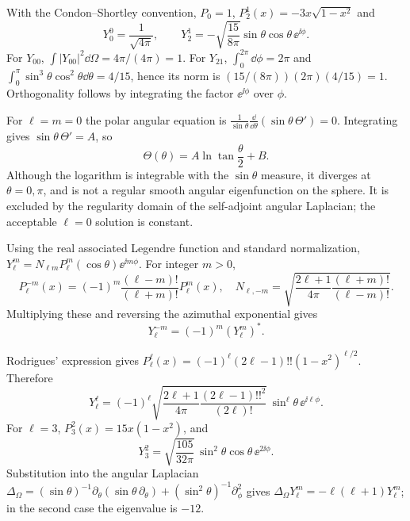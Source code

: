 With the Condon--Shortley convention,
$P_0=1$, $P_2^1(x)=-3x\sqrt{1-x^2}$ and
\begin{equation}
\boxed{Y_0^0=\frac1{\sqrt{4\pi}},
\qquad Y_2^1=-\sqrt{\frac{15}{8\pi}}\sin\theta
\cos\theta\,\ee^{\ii\phi}}.
\end{equation}
For $Y_{00}$,
$\int|Y_{00}|^2\dd\Omega=4\pi/(4\pi)=1$.
For $Y_{21}$,
$\int_0^{2\pi}\dd\phi=2\pi$ and
$\int_0^\pi\sin^3\theta\cos^2\theta\dd\theta
=4/15$, hence its norm is
$(15/(8\pi))(2\pi)(4/15)=1$.
Orthogonality follows by integrating the
factor $\ee^{\ii\phi}$ over $\phi$.

For $\ell=m=0$ the polar angular equation is
$\frac1{\sin\theta}\frac{\dd}{\dd\theta}
(\sin\theta\,\Theta')=0$. Integrating gives
$\sin\theta\,\Theta'=A$, so
\begin{equation}
\Theta(\theta)=A\ln\tan\frac\theta2+B.
\end{equation}
Although the logarithm is integrable with
the $\sin\theta$ measure, it diverges at
$\theta=0,\pi$, and is not a regular smooth
angular eigenfunction on the sphere.
It is excluded by the regularity domain of
the self-adjoint angular Laplacian; the
acceptable $\ell=0$ solution is constant.

Using the real associated Legendre function
and standard normalization,
$Y_\ell^m=N_{\ell m}P_\ell^m(\cos\theta)\ee^{\ii m\phi}$.
For integer $m>0$,
\begin{equation}
P_\ell^{-m}(x)=(-1)^m
\frac{(\ell-m)!}{(\ell+m)!}P_\ell^m(x),\quad
N_{\ell,-m}=
\sqrt{\frac{2\ell+1}{4\pi}
\frac{(\ell+m)!}{(\ell-m)!}}.
\end{equation}
Multiplying these and reversing the
azimuthal exponential gives
\begin{equation}
\boxed{Y_\ell^{-m}=(-1)^m(Y_\ell^{m})^*}.
\end{equation}

Rodrigues' expression gives
$P_\ell^\ell(x)=(-1)^\ell(2\ell-1)!!
(1-x^2)^{\ell/2}$.
Therefore
\begin{equation}
\boxed{Y_\ell^\ell=
(-1)^\ell
\sqrt{\frac{2\ell+1}{4\pi}
\frac{(2\ell-1)!!^2}{(2\ell)!}}\,
\sin^\ell\theta\,\ee^{\ii\ell\phi}}.
\end{equation}
For $\ell=3$, $P_3^2(x)=15x(1-x^2)$,
and
\begin{equation}
\boxed{Y_3^2=
\sqrt{\frac{105}{32\pi}}\,
\sin^2\theta\cos\theta\,\ee^{2\ii\phi}}.
\end{equation}
Substitution into the angular Laplacian
$\Delta_\Omega=
(\sin\theta)^{-1}\partial_\theta
(\sin\theta\,\partial_\theta)
+(\sin^2\theta)^{-1}\partial_\phi^2$
gives $\Delta_\Omega Y_\ell^m
=-\ell(\ell+1)Y_\ell^m$;
in the second case the eigenvalue is $-12$.

